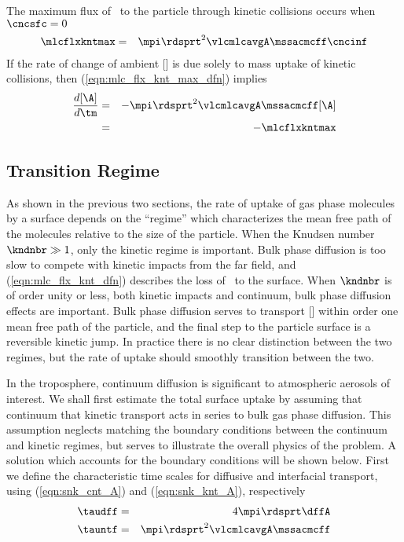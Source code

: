 \documentclass[12pt,twoside]{book}
\begin{document}
The maximum flux of \A\ to the particle through kinetic collisions
occurs when $\cncsfc = 0$ 
\begin{eqnarray}
\mlcflxkntmax & = & \mpi \rdsprt^{2} \vlcmlcavgA \mssacmcff \cncinf
\label{eqn:mlc_flx_knt_max_dfn}
\end{eqnarray}
If the rate of change of ambient [\A] is due solely to mass uptake of
kinetic collisions, then (\ref{eqn:mlc_flx_knt_max_dfn}) implies
\begin{eqnarray}
\frac{d [\A]}{d \tm } & = & - \mpi \rdsprt^{2} \vlcmlcavgA \mssacmcff [\A] \\
& = & - \mlcflxkntmax
\label{eqn:snk_knt_A}
\end{eqnarray}

\subsection[Transition Regime]{Transition Regime}\label{sxn:trn}
As shown in the previous two sections, the rate of uptake of gas phase
molecules by a surface depends on the ``regime'' which characterizes
the mean free path of the molecules relative to the size of the
particle.  
When the Knudsen number $\kndnbr \gg 1$, only the kinetic regime is
important.  
Bulk phase diffusion is too slow to compete with kinetic impacts from
the far field, and (\ref{eqn:mlc_flx_knt_dfn}) describes the loss of
\A\ to the surface.
When $\kndnbr$ is of order unity or less, both kinetic impacts and
continuum, bulk phase diffusion effects are important.  
Bulk phase diffusion serves to transport [\A] within order one mean
free path of the particle, and the final step to the particle surface
is a reversible kinetic jump.
In practice there is no clear distinction between the two regimes, but 
the rate of uptake should smoothly transition between the two.

In the troposphere, continuum diffusion is significant to atmospheric
aerosols of interest.
We shall first estimate the total surface uptake by assuming that
continuum that kinetic transport acts in series to bulk gas phase
diffusion.  
This assumption neglects matching the boundary conditions between the
continuum and kinetic regimes, but serves to illustrate the overall
physics of the problem.
A solution which accounts for the boundary conditions will be shown
below. 
First we define the characteristic time scales for diffusive and
interfacial transport, using (\ref{eqn:snk_cnt_A}) and
(\ref{eqn:snk_knt_A}), respectively
\begin{eqnarray}
\taudff & = & 4 \mpi \rdsprt \dffA \\
\tauntf & = & \mpi \rdsprt^{2} \vlcmlcavgA \mssacmcff
\label{eqn:tau_dff_ntf}
\end{eqnarray}
\end{document}
